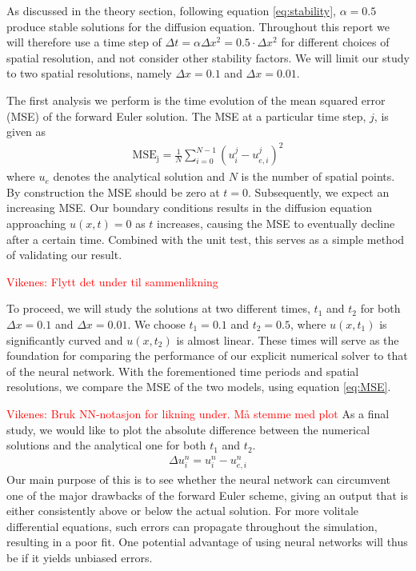 \documentclass[12pt]{extarticle}
\begin{document}
As discussed in the theory section, following equation \eqref{eq:stability}, $\alpha=0.5$ produce stable solutions for the diffusion equation. Throughout this report we will therefore use a time step of $\Delta t = \alpha \Delta x^2 = 0.5\cdot \Delta x^2$ for different choices of spatial resolution, and not consider other stability factors. We will limit our study to two spatial resolutions, namely $\Delta x = 0.1$ and $\Delta x = 0.01$.  

The first analysis we perform is the time evolution of the mean squared error (MSE) of the forward Euler solution. The MSE at a particular time step, $j$, is given as 
\begin{align} \label{eq:MSE}
	\mathrm{MSE_j} = \frac{1}{N}\sum_{i=0}^{N-1} (u_i^j - u_{e,i}^j)^2 
\end{align}
where $u_e$ denotes the analytical solution and $N$ is the number of spatial points. By construction the MSE should be zero at $t=0$. Subsequently, we expect an increasing MSE. Our boundary conditions results in the diffusion equation approaching $u(x,t)=0$ as $t$ increases, causing the MSE to eventually decline after a certain time. Combined with the unit test, this serves as a simple method of validating our result.  

\textcolor{red}{Vikenes: Flytt det under til sammenlikning}

To proceed, we will study the solutions at two different times, $t_1$ and $t_2$ for both $\Delta x = 0.1$ and $\Delta x = 0.01$. We choose $t_1=0.1$ and $t_2=0.5$, where $u(x,t_1)$ is significantly curved and $u(x,t_2)$ is almost linear. These times will serve as the foundation for comparing the performance of our explicit numerical solver to that of the neural network. With the forementioned time periods and spatial resolutions, we compare the MSE of the two models, using equation \eqref{eq:MSE}. 

\textcolor{red}{Vikenes: Bruk NN-notasjon for likning under. Må stemme med plot}
As a final study, we would like to plot the absolute difference between the numerical solutions and the analytical one for both $t_1$ and $t_2$. 
\begin{align} \label{eq:absolute_difference}
	\Delta u_i^n = u_i^n - u_{e,i}^n
\end{align}
Our main purpose of this is to see whether the neural network can circumvent one of the major drawbacks of the forward Euler scheme, giving an output that is either consistently above or below the actual solution. For more volitale differential equations, such errors can propagate throughout the simulation, resulting in a poor fit. One potential advantage of using neural networks will thus be if it yields unbiased errors. 
\end{document}
